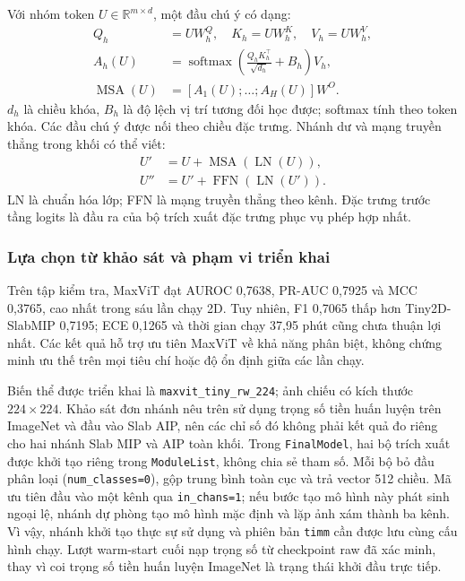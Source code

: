 \documentclass[14pt,a4paper,oneside]{extreport}
\begin{document}
Với nhóm token $U\in\mathbb R^{m\times d}$, một đầu chú ý có dạng:
\begingroup
\setlength{\jot}{8pt}
\begin{align}
 Q_h&=UW_h^Q,\quad K_h=UW_h^K,\quad V_h=UW_h^V,\\
 A_h(U)&=\operatorname{softmax}\!\left(
 \frac{Q_hK_h^\top}{\sqrt{d_h}}+B_h\right)V_h,\\
 \operatorname{MSA}(U)&=[A_1(U);\ldots;A_H(U)]W^O.
 \label{eq:maxvit-attention}
\end{align}
\endgroup
$d_h$ là chiều khóa, $B_h$ là độ lệch vị trí tương đối học được;
softmax tính theo token khóa. Các đầu chú ý được nối theo chiều đặc
trưng. Nhánh dư và mạng truyền thẳng trong khối có thể viết:
\begin{align}
 U'&=U+\operatorname{MSA}(\operatorname{LN}(U)),\\
 U''&=U'+\operatorname{FFN}(\operatorname{LN}(U')).
 \label{eq:maxvit-residual}
\end{align}
LN là chuẩn hóa lớp; FFN là mạng truyền thẳng theo kênh. Đặc trưng
trước tầng logits là đầu ra của bộ trích xuất đặc trưng phục vụ phép hợp nhất.

\subsubsection{Lựa chọn từ khảo sát và phạm vi triển khai}
Trên tập kiểm tra, MaxViT đạt AUROC 0,7638, PR-AUC 0,7925 và MCC 0,3765,
cao nhất trong sáu lần chạy 2D. Tuy nhiên, F1 0,7065 thấp hơn Tiny2D-SlabMIP 0,7195;
ECE 0,1265 và thời gian chạy 37,95 phút cũng chưa thuận lợi nhất.
Các kết quả hỗ trợ ưu tiên MaxViT về khả năng phân biệt, không chứng
minh ưu thế trên mọi tiêu chí hoặc độ ổn định giữa các lần chạy.

Biến thể được triển khai là \texttt{maxvit\_tiny\_rw\_224}; ảnh chiếu có
kích thước $224\times224$. Khảo sát đơn nhánh nêu trên sử dụng trọng số
tiền huấn luyện trên ImageNet và đầu vào Slab AIP, nên các chỉ số đó
không phải kết quả đo riêng cho hai nhánh Slab MIP và AIP toàn khối.
Trong \texttt{FinalModel}, hai bộ trích xuất được khởi tạo riêng trong
\texttt{ModuleList}, không chia sẻ tham số. Mỗi bộ bỏ đầu phân loại
(\texttt{num\_classes=0}), gộp trung bình toàn cục và trả vector 512 chiều.
Mã ưu tiên đầu vào một kênh qua \texttt{in\_chans=1}; nếu bước tạo mô hình
này phát sinh ngoại lệ, nhánh dự phòng tạo mô hình mặc định và lặp ảnh
xám thành ba kênh. Vì vậy, nhánh khởi tạo thực sự sử dụng và phiên bản
\texttt{timm} cần được lưu cùng cấu hình chạy.
Lượt warm-start cuối nạp trọng số từ checkpoint raw đã xác minh, thay
vì coi trọng số tiền huấn luyện ImageNet là trạng thái khởi đầu trực tiếp.
\end{document}
